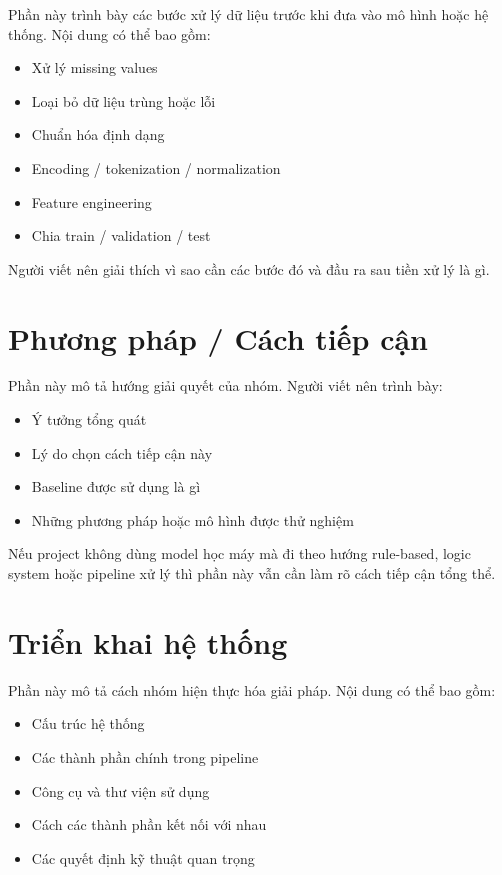 \documentclass[12pt]{ai_conquer2026}
\begin{document}
Phần này trình bày các bước xử lý dữ liệu trước khi đưa vào mô hình hoặc hệ thống. Nội dung có thể bao gồm:
\begin{itemize}
    \item Xử lý missing values
    \item Loại bỏ dữ liệu trùng hoặc lỗi
    \item Chuẩn hóa định dạng
    \item Encoding / tokenization / normalization
    \item Feature engineering
    \item Chia train / validation / test
\end{itemize}

Người viết nên giải thích vì sao cần các bước đó và đầu ra sau tiền xử lý là gì.

\section{Phương pháp / Cách tiếp cận}

Phần này mô tả hướng giải quyết của nhóm. Người viết nên trình bày:
\begin{itemize}
    \item Ý tưởng tổng quát
    \item Lý do chọn cách tiếp cận này
    \item Baseline được sử dụng là gì
    \item Những phương pháp hoặc mô hình được thử nghiệm
\end{itemize}

Nếu project không dùng model học máy mà đi theo hướng rule-based, logic system hoặc pipeline xử lý thì phần này vẫn cần làm rõ cách tiếp cận tổng thể.

\section{Triển khai hệ thống}

Phần này mô tả cách nhóm hiện thực hóa giải pháp. Nội dung có thể bao gồm:
\begin{itemize}
    \item Cấu trúc hệ thống
    \item Các thành phần chính trong pipeline
    \item Công cụ và thư viện sử dụng
    \item Cách các thành phần kết nối với nhau
    \item Các quyết định kỹ thuật quan trọng
\end{itemize}
\end{document}
